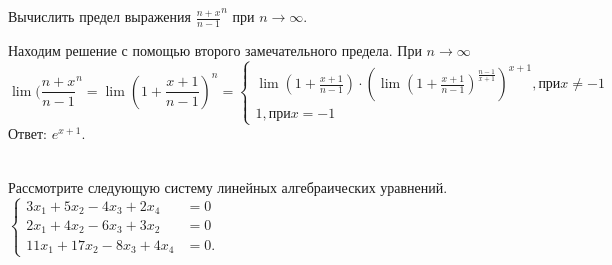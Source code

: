 \documentclass[addpoints, answers]{exam} %
\begin{document}
\begin{questions}
\question[10] Вычислить предел выражения $\frac{n+x}{n-1}^n$ при $n\to \infty$.\\

\begin{solution}
Находим решение с помощью второго замечательного предела. При $n \to \infty$
\[
\lim(\frac{n+x}{n-1}^n=\lim (1+\frac{x+1}{n-1})^n=\begin{cases}
\lim (1+\frac{x+1}{n-1})\cdot \left(\lim(1+\frac{x+1}{n-1})^{\frac{n-1}{x+1}}\right)^{x+1},   \text{при} x\ne -1  \\
1, \text{при} x=-1
\end{cases}
\]
Ответ: $e^{x+1}$.\\\\
\end{solution}

\question Рассмотрите следующую систему линейных алгебраических уравнений.\\
$\left\{
\begin{aligned}
3x_1+5x_2-4x_3+2x_4 &=0\\
2x_1+4x_2-6x_3+3x_2 &=0\\
11x_1+17x_2-8x_3+4x_4&=0.
\end{aligned}\right.$\\
\end{questions}
\end{document}
